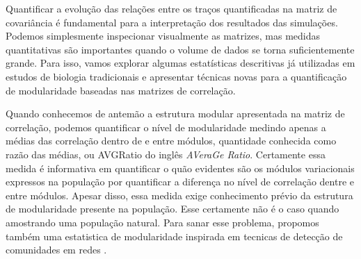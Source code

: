 Quantificar a evolução das relações entre os traços quantificadas na
matriz de covariância é fundamental para a interpretação dos resultados
das simulações. 
Podemos simplesmente inspecionar visualmente as matrizes, mas medidas
quantitativas são importantes quando o volume de dados se torna
suficientemente grande. 
Para isso, vamos explorar algumas estatísticas descritivas já utilizadas em
estudos de biologia tradicionais e apresentar técnicas novas para a
quantificação de modularidade baseadas nas matrizes de correlação.

Quando conhecemos de antemão a estrutura modular apresentada na matriz
de correlação, podemos quantificar o nível de modularidade medindo
apenas a médias das correlação dentro de e entre módulos, quantidade
conhecida como razão das médias, ou AVGRatio do inglês {\it AVeraGe Ratio}. 
Certamente essa medida é informativa em quantificar o quão evidentes são
os módulos variacionais expressos na população por quantificar a
diferença no nível de correlação dentre e entre módulos. 
Apesar disso, essa medida exige conhecimento prévio da estrutura de
modularidade presente na população. 
Esse certamente não é o caso quando amostrando uma população natural.
Para sanar esse problema, propomos também uma estatistica de
modularidade inspirada em tecnicas de detecção de comunidades em redes
\citep{Newman2006, Reichardt2006}.






